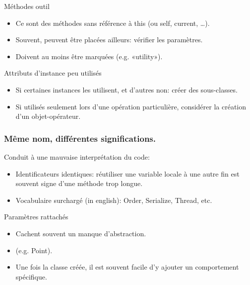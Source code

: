 



\begin{frame} {Méthodes outil}
\vspace{1cm}
	\begin{itemize}
	\item Ce sont des méthodes sans référence à this (ou self, current, \ldots).	
	\item Souvent, peuvent être placées ailleurs: vérifier les paramètres.
	\item Doivent au moins être marquées (e.g. «utility»).
	\end{itemize}
	
\end{frame}








\begin{frame} {Attributs d'instance peu utilisés}
\vspace{1cm}
	\begin{itemize}
	\item Si certaines instances les utilisent, et d'autres non: créer 
	des sous-classes.	
	\item Si utilisés seulement lors d'une opération particulière, considérer la création
		d'un objet-opérateur.
	\end{itemize}
	
\end{frame}

\begin{frame}
\frametitle{Même nom, différentes significations.}
Conduit à une mauvaise interprétation du code:
\begin{itemize}
\item Identificateurs identiques: réutiliser une variable locale à une autre fin est souvent signe d'une méthode trop longue.
\item Vocabulaire surchargé (in english): Order, Serialize, Thread, etc.
\end{itemize}
\end{frame}

\begin{frame} {Paramètres rattachés}
\vspace{1cm}
	\begin{itemize}
	\item Cachent souvent un manque d'abstraction.	
	\item (e.g. Point).
	\item Une fois la classe créée, il est souvent facile d'y ajouter
		un comportement spécifique.
	\end{itemize}
\end{frame}




